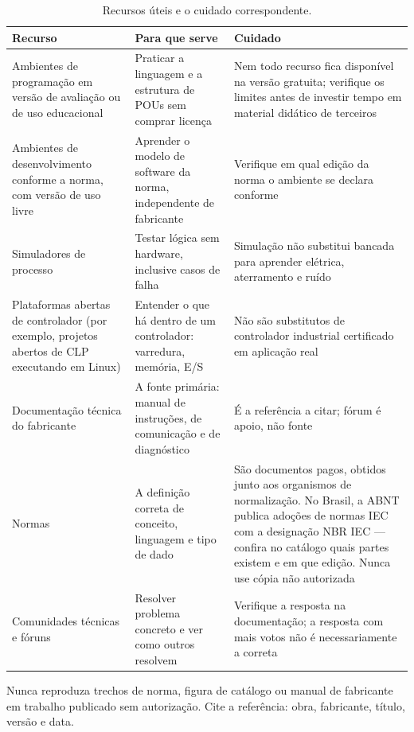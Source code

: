 \begin{table}[H]
  \centering
  \caption{Recursos úteis e o cuidado correspondente.}
  \label{tab:recursos-estudo}
  \begin{tabular}{p{3.6cm} p{5.2cm} p{5.5cm}}
    \toprule
    Recurso & Para que serve & Cuidado \\
    \midrule
    Ambientes de programação em versão de avaliação ou de uso educacional
      & Praticar a linguagem e a estrutura de POUs sem comprar licença
      & Nem todo recurso fica disponível na versão gratuita; verifique os limites antes de investir
        tempo em material didático de terceiros \\
    \addlinespace
    Ambientes de desenvolvimento conforme a norma, com versão de uso livre
      & Aprender o modelo de software da norma, independente de fabricante
      & Verifique em qual edição da norma o ambiente se declara conforme \\
    \addlinespace
    Simuladores de processo
      & Testar lógica sem hardware, inclusive casos de falha
      & Simulação não substitui bancada para aprender elétrica, aterramento e ruído \\
    \addlinespace
    Plataformas abertas de controlador (por exemplo, projetos abertos de CLP executando em Linux)
      & Entender o que há dentro de um controlador: varredura, memória, E/S
      & Não são substitutos de controlador industrial certificado em aplicação real \\
    \addlinespace
    Documentação técnica do fabricante
      & A fonte primária: manual de instruções, de comunicação e de diagnóstico
      & É a referência a citar; fórum é apoio, não fonte \\
    \addlinespace
    Normas
      & A definição correta de conceito, linguagem e tipo de dado
      & São documentos pagos, obtidos junto aos organismos de normalização. No Brasil, a ABNT publica
        adoções de normas IEC com a designação NBR IEC --- confira no catálogo quais partes existem e
        em que edição. Nunca use cópia não autorizada \\
    \addlinespace
    Comunidades técnicas e fóruns
      & Resolver problema concreto e ver como outros resolvem
      & Verifique a resposta na documentação; a resposta com mais votos não é necessariamente a
        correta \\
    \bottomrule
  \end{tabular}
\end{table}

Nunca reproduza trechos de norma, figura de catálogo ou manual de fabricante em trabalho publicado
sem autorização. Cite a referência: obra, fabricante, título, versão e data.

